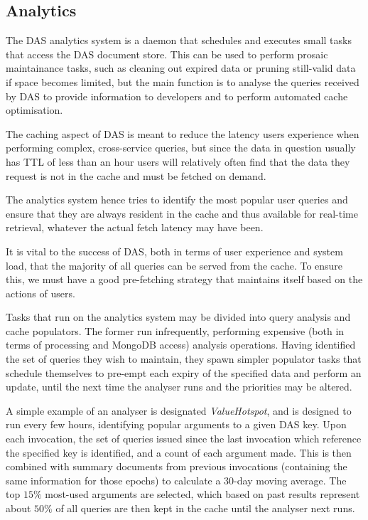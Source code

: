 \documentclass[a4paper]{jpconf}
\begin{document}
\subsection{\label{analytics}Analytics}

The DAS analytics system is a daemon that schedules and executes small tasks that access the DAS document store. This can be used to perform prosaic maintainance tasks, such as cleaning out expired data or pruning still-valid data if space becomes limited, but the main function is to analyse the queries received by DAS to provide information to developers and to perform automated cache optimisation.

The caching aspect of DAS is meant to reduce the latency users experience when performing complex, cross-service queries, but since the data in question usually has TTL of less than an hour users will relatively often find that the data they request is not in the cache and must be fetched on demand.

The analytics system hence tries to identify the most popular user queries and ensure that they are always resident in the cache and thus available for real-time retrieval, whatever the actual fetch latency may have been.

It is vital to the success of DAS, both in terms of user experience and system load, that the majority of all queries can be served from the cache. To ensure this, we must have a good pre-fetching strategy that maintains itself based on the actions of users.

Tasks that run on the analytics system may be divided into query analysis and cache populators. The former run infrequently, performing expensive (both in terms of processing and MongoDB access) analysis operations. Having identified the set of queries they wish to maintain, they spawn simpler populator tasks that schedule themselves to pre-empt each expiry of the specified data and perform an update, until the next time the analyser runs and the priorities may be altered.

A simple example of an analyser is designated \emph{ValueHotspot}, and is designed to run every few hours, identifying popular arguments to a given DAS key. Upon each invocation, the set of queries issued since the last invocation which reference the specified key is identified, and a count of each argument made. This is then combined with summary documents from previous invocations (containing the same information for those epochs) to calculate a 30-day moving average. The top $15\%$ most-used arguments are selected, which based on past results represent about $50\%$ of all queries are then kept in the cache until the analyser next runs.
\end{document}
